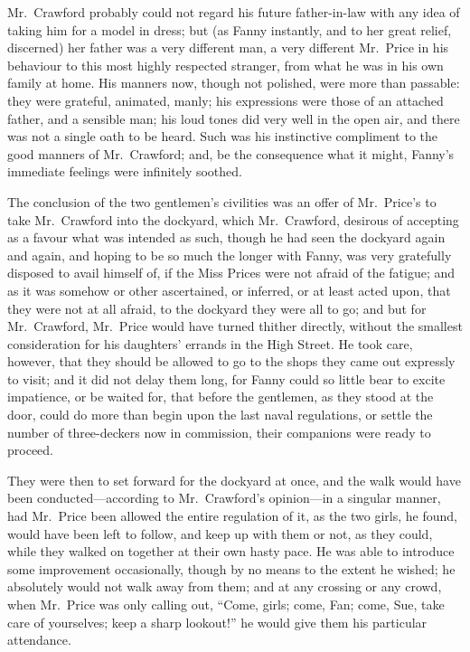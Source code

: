 \documentclass{article}
\begin{document}
Mr.\ Crawford probably could not regard his future
father-in-law with any idea of taking him for a model
in dress; but (as Fanny instantly, and to her great
relief, discerned) her father was a very different man,
a very different Mr.\ Price in his behaviour to this most
highly respected stranger, from what he was in his own
family at home.  His manners now, though not polished,
were more than passable:  they were grateful, animated, manly;
his expressions were those of an attached father,
and a sensible man; his loud tones did very well in the
open air, and there was not a single oath to be heard.
Such was his instinctive compliment to the good manners
of Mr.\ Crawford; and, be the consequence what it might,
Fanny's immediate feelings were infinitely soothed.

The conclusion of the two gentlemen's civilities was an offer
of Mr.\ Price's to take Mr.\ Crawford into the dockyard,
which Mr.\ Crawford, desirous of accepting as a favour
what was intended as such, though he had seen the dockyard
again and again, and hoping to be so much the longer
with Fanny, was very gratefully disposed to avail himself of,
if the Miss Prices were not afraid of the fatigue;
and as it was somehow or other ascertained, or inferred,
or at least acted upon, that they were not at all afraid,
to the dockyard they were all to go; and but for
Mr.\ Crawford, Mr.\ Price would have turned thither directly,
without the smallest consideration for his daughters'
errands in the High Street.  He took care, however, that they
should be allowed to go to the shops they came out expressly
to visit; and it did not delay them long, for Fanny could
so little bear to excite impatience, or be waited for,
that before the gentlemen, as they stood at the door,
could do more than begin upon the last naval regulations,
or settle the number of three-deckers now in commission,
their companions were ready to proceed.

They were then to set forward for the dockyard at once,
and the walk would have been conducted---according to
Mr.\ Crawford's opinion---in a singular manner,
had Mr.\ Price been allowed the entire regulation of it,
as the two girls, he found, would have been left
to follow, and keep up with them or not, as they could,
while they walked on together at their own hasty pace.
He was able to introduce some improvement occasionally,
though by no means to the extent he wished; he absolutely
would not walk away from them; and at any crossing
or any crowd, when Mr.\ Price was only calling out,
``Come, girls; come, Fan; come, Sue, take care of yourselves;
keep a sharp lookout!'' he would give them his particular
attendance.
\end{document}
